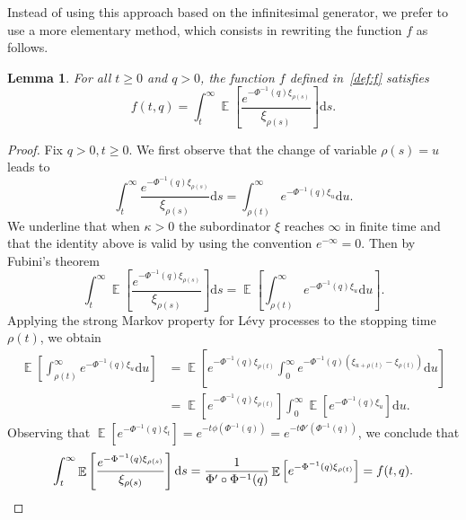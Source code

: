\documentclass[10pt]{amsart}
\newtheorem{lemm}[theo]{Lemma}
\theoremstyle{definition}
\numberwithin{equation}{section}
\DeclareMathOperator{\E}{\mathbb{E}}
\newcommand{\dd}{\mathrm{d}}
\begin{document}
Instead of using this approach based on the infinitesimal generator, we prefer to use a more elementary method, which consists in rewriting the function $f$ as follows.
\begin{lemm}\label{lem:rewritten}
For all $t \geq 0$ and $q > 0$, the function $f$ defined in~\eqref{def:f} satisfies
\[
f(t,q) = \int_t^\infty \E\left[\frac{e^{-\Phi^{-1}(q)\xi_{\rho(s)}}}{\xi_{\rho(s)}} \right] \dd s.
\]
\end{lemm}


\begin{proof}
Fix $q>0, t \geq 0$.
We first observe that the change of variable $\rho(s) = u$ leads to
\[
\int_t^\infty \frac{e^{-\Phi^{-1}(q) \xi_{\rho(s)}}}{\xi_{\rho(s)}} \dd s = \int_{\rho(t)}^{\infty} e^{-\Phi^{-1}(q) \xi_u} \dd u.
\]
We underline that when $\kappa > 0$ the subordinator $\xi$ reaches $\infty$ in finite time and that the identity above is valid by using the convention $e^{-\infty} = 0$. Then by Fubini's theorem
\[
\int_t^\infty \E\left[\frac{e^{-\Phi^{-1}(q)\xi_{\rho(s)}}}{\xi_{\rho(s)}} \right] \dd s =
\E\left[\int_{\rho(t)}^{\infty} e^{-\Phi^{-1}(q) \xi_u} \dd u \right].
\]
Applying the strong Markov property for Lévy processes to the stopping time $\rho(t)$, we obtain
\begin{align*}
\E\left[\int_{\rho(t)}^{\infty} e^{-\Phi^{-1}(q) \xi_u} \dd u \right] &= \E\left[e^{-\Phi^{-1}(q) \xi_{\rho(t)}} \int_0^{\infty} e^{-\Phi^{-1}(q) \left(\xi_{u +\rho(t)} - \xi_{\rho(t)}\right)} \dd u \right]\\
&= \E\left[e^{-\Phi^{-1}(q) \xi_{\rho(t)}} \right] \int_0^\infty \E\left[e^{-\Phi^{-1}(q) \xi_{u}} \right] \dd u.
\end{align*}
Observing that $\E[e^{- \Phi^{-1}(q) \xi_t}] = e^{-t \phi(\Phi^{-1}(q))}=e^{-t \Phi'(\Phi^{-1}(q))}$, we conclude that
\[
\int_t^\infty \E\left[\frac{e^{-\Phi^{-1}(q)\xi_{\rho(s)}}}{\xi_{\rho(s)}} \right] \dd s = \frac{1}{\Phi' \circ \Phi^{-1}(q)}\E\left[e^{-\Phi^{-1}(q) \xi_{\rho(t)}} \right] = f(t,q). \qedhere
\]
\end{proof}
\end{document}

